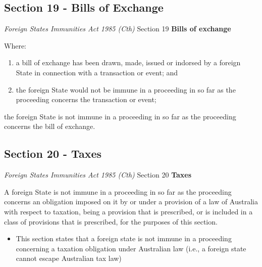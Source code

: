 \subsection{Section 19 - Bills of Exchange}
\begin{statutedetails}{\textit{Foreign States Immunities Act 1985 (Cth)} Section 19}
    \flushleft
    \textbf{Bills of exchange}

    \vspace{\baselineskip}

    Where:
    \begin{enumerate}[label=(\alph*)]
        \item a \gls{bill of exchange} has been drawn, made, issued or indorsed by a foreign State in connection with a transaction or event; and
        \item the foreign State would not be immune in a proceeding in so far as the proceeding concerns the transaction or event;
    \end{enumerate}
    the foreign State is not immune in a proceeding in so far as the proceeding concerns the \gls{bill of exchange}.
\end{statutedetails}

\subsection{Section 20 - Taxes}
\begin{statutedetails}{\textit{Foreign States Immunities Act 1985 (Cth)} Section 20}
    \flushleft
    \textbf{Taxes}

    \vspace{\baselineskip}

    A foreign State is not immune in a proceeding in so far as the proceeding concerns an obligation imposed on it by or under a provision of a law of Australia with respect to taxation, being a provision that is prescribed, or is included in a class of provisions that is prescribed, for the purposes of this section.
\end{statutedetails}

\begin{itemize}
    \item This section states that a foreign state is not immune in a proceeding concerning a taxation obligation under Australian law (i.e., a foreign state cannot escape Australian tax law)
\end{itemize}

